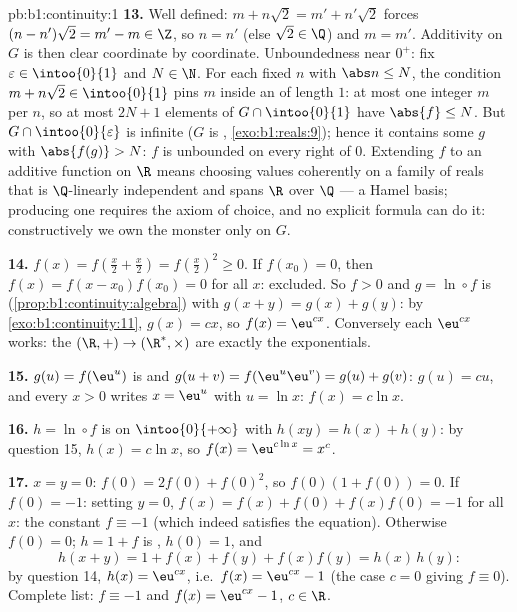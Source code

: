 \begin{solution}{pb:b1:continuity:1}
\textbf{13.} Well defined: $m + n\sqrt2 = m' + n'\sqrt2$ forces
$(n - n')\sqrt2 = m' - m \in \Z$, so $n = n'$ (else $\sqrt2 \in
\Q$) and $m = m'$. Additivity on $G$ is then clear coordinate by
coordinate. Unboundedness near $0^+$: fix $\varepsilon \in
\intoo{0}{1}$ and $N \in \N$. For each fixed $n$ with $\abs n
\leq N$, the condition $m + n\sqrt2 \in \intoo{0}{1}$ pins $m$
inside an  of length $1$: at most one integer $m$ per
$n$, so at most $2N + 1$ elements of $G \cap \intoo{0}{1}$ have
$\abs{f} \leq N$. But $G \cap \intoo{0}{\varepsilon}$ is
infinite ($G$ is , \cref{exo:b1:reals:9}); hence it
contains some $g$ with $\abs{f(g)} > N$: $f$ is unbounded on
every right  of $0$. Extending $f$ to an additive
function on $\R$ means choosing values coherently on a family of
reals that is $\Q$-linearly independent and spans $\R$ over $\Q$
--- a Hamel basis; producing one requires the axiom of choice,
and no explicit formula can do it: constructively we own the
monster only on $G$.

\textbf{14.} $f(x) = f(\frac x2 + \frac x2) = f(\frac x2)^2 \geq
0$. If $f(x_0) = 0$, then $f(x) = f(x - x_0)f(x_0) = 0$ for all
$x$: excluded. So $f > 0$ and $g = \ln \circ f$ is 
(\cref{prop:b1:continuity:algebra}) with $g(x + y) = g(x) +
g(y)$: by \cref{exo:b1:continuity:11}, $g(x) = cx$, so $f(x) =
\eu^{cx}$. Conversely each $\eu^{cx}$ works: the 
 $(\R, +) \to (\R^*, \times)$ are exactly the
exponentials.

\textbf{15.} $g(u) = f(\eu^u)$ is  and $g(u + v) =
f(\eu^u \eu^v) = g(u) + g(v)$: $g(u) = cu$, and every $x > 0$
writes $x = \eu^u$ with $u = \ln x$: $f(x) = c\ln x$.

\textbf{16.} $h = \ln \circ f$ is  on
$\intoo{0}{+\infty}$ with $h(xy) = h(x) + h(y)$: by question 15,
$h(x) = c\ln x$, so $f(x) = \eu^{c\ln x} = x^c$.

\textbf{17.} $x = y = 0$: $f(0) = 2f(0) + f(0)^2$, so $f(0)(1 +
f(0)) = 0$. If $f(0) = -1$: setting $y = 0$, $f(x) = f(x) +
f(0) + f(x)f(0) = -1$ for all $x$: the constant $f \equiv -1$
(which indeed satisfies the equation). Otherwise $f(0) = 0$; $h
= 1 + f$ is , $h(0) = 1$, and
\[
h(x + y) = 1 + f(x) + f(y) + f(x)f(y) = h(x)\,h(y) :
\]
by question 14, $h(x) = \eu^{cx}$, i.e.\ $f(x) = \eu^{cx} - 1$
(the case $c = 0$ giving $f \equiv 0$). Complete list: $f
\equiv -1$ and $f(x) = \eu^{cx} - 1$, $c \in \R$.


\end{solution}
